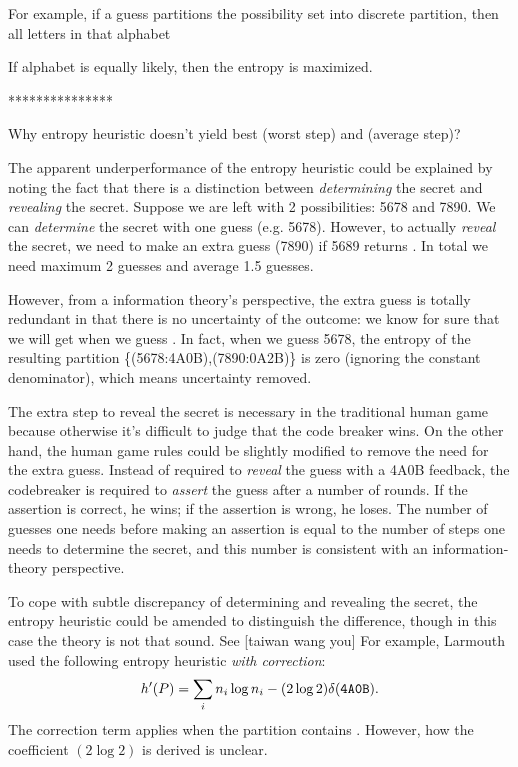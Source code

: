 For example, if a guess partitions the possibility set into discrete partition, then all letters in that alphabet 

If alphabet is equally likely, then the entropy is maximized.


***************

Why entropy heuristic doesn't yield best (worst step) and (average step)?

The apparent underperformance of the entropy heuristic could be explained by noting the fact that there is a distinction between \emph{determining} the secret and \emph{revealing} the secret. Suppose we are left with 2 possibilities: 5678 and 7890. We can \emph{determine} the secret with one guess (e.g. 5678). However, to actually \emph{reveal} the secret, we need to make an extra guess (7890) if 5689 returns . In total we need maximum 2 guesses and average 1.5 guesses.

However, from a information theory's perspective, the extra guess is totally redundant in that there is no uncertainty of the outcome: we know for sure that we will get  when we guess . In fact, when we guess 5678, the entropy of the resulting partition \{(5678:4A0B),(7890:0A2B)\} is zero (ignoring the constant denominator), which means uncertainty removed.

The extra step to reveal the secret is necessary in the traditional human game because otherwise it's difficult to judge that the code breaker wins. On the other hand, the human game rules could be slightly modified to remove the need for the extra guess. Instead of required to \emph{reveal} the guess with a 4A0B feedback, the codebreaker is required to \emph{assert} the guess after a number of rounds. If the assertion is correct, he wins; if the assertion is wrong, he loses. The number of guesses one needs before making an assertion is equal to the number of steps one needs to determine the secret, and this number is consistent with an information-theory perspective.

To cope with subtle discrepancy of determining and revealing the secret, the entropy heuristic could be amended to distinguish the difference, though in this case the theory is not that sound. See [taiwan wang you] For example, Larmouth \cite{aleph71} used the following entropy heuristic \emph{with correction}:
\[
h'(P) = \sum_i n_i \log n_i - (2 \log 2) \delta(\texttt{{4}A{0}B})  .
\]
The correction term applies when the partition contains . However, how the coefficient $(2 \log 2)$ is derived is unclear.

